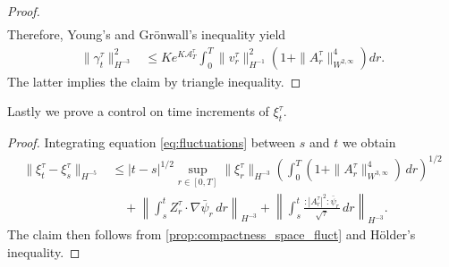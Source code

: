\documentclass[a4paper,10pt]{amsart}
\newcommand{\norm}[1]{\left\|#1\right\|}
\newcommand{\wick}[1]{:\mathrel{#1}:}
\newcommand{\Bk}{\color{black}}
\newcommand{\Rd}{\color{red}}
\newtheorem{proposition}[theorem]{Proposition}
\theoremstyle{remark}
\numberwithin{equation}{section}
\begin{document}
\begin{proof}
\begin{align*}
    \end{align*}
    Therefore, Young's and Gr\"onwall's inequality yield
    \begin{align*}
        \|\gamma^{\tau}_t\|_{H^{-3}}^2
        &\leq K e^{K\mathcal A_T^\tau}
        \int_0^T \|v^{\tau}_r\|^2_{H^{-1}}
        \left(1+\|A^\tau_r\|^4_{W^{2,\infty}}\right) dr.
    \end{align*}
    The latter implies the claim by triangle inequality.
\end{proof}
Lastly we prove a control on time increments of $\xi^{\tau}_t$.


\begin{proof}
    Integrating equation \eqref{eq:fluctuations} between $s$ and $t$ we obtain
    \begin{align*}
        \|\xi^{\tau}_t-\xi^{\tau}_s\|_{H^{-5}}
        &\leq |t-s|^{1/2}
        \sup_{r\in[0,T]}\|\xi^{\tau}_r\|_{H^{-3}}
        \left(\int_0^T
        (1+\|A^{\tau}_r\|^4_{W^{3,\infty}})\,dr\right)^{1/2}\\
        &\quad+\norm{\int_s^t
        Z^{\tau}_r\cdot\nabla\bar{\psi}_r\,dr}_{H^{-3}}
        +\norm{\int_s^t
        \frac{\wick{|A^\tau_r|^2}\bar{\psi}_r}{\sqrt{\tau}}\,dr}_{H^{-3}}.
    \end{align*}
    The claim then follows from \cref{prop:compactness_space_fluct} and
    H\"older's inequality.
\end{proof}
\end{document}
